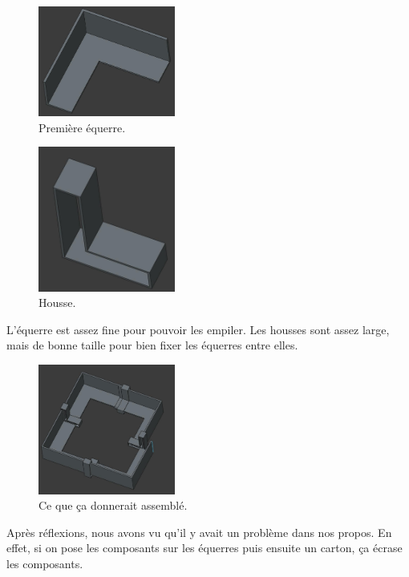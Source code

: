 \documentclass[a4paper,12pt]{report}  %
\begin{document}
\begin{figure}[H]
	\centering
	\includegraphics[width=0.4\textwidth]{./attachments/cad_equerre.jpg}
	\caption{Première équerre.}
\end{figure}

\begin{figure}[H]
	\centering
	\includegraphics[width=0.4\textwidth]{./attachments/cad_housse.jpg}
	\caption{Housse.}
\end{figure}

L’équerre est assez fine pour pouvoir les empiler. Les housses sont assez large, mais de bonne taille pour bien fixer les équerres entre elles.

\begin{figure}[H]
	\centering
	\includegraphics[width=0.4\textwidth]{./attachments/cad_assemblage.jpg}
	\caption{Ce que ça donnerait assemblé.}
\end{figure}

Après réflexions, nous avons vu qu’il y avait un problème dans nos propos. En effet, si on pose les composants sur les équerres puis ensuite un carton, ça écrase les composants.
\end{document}
